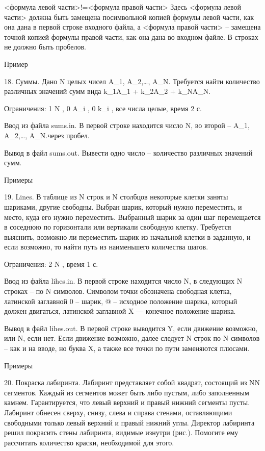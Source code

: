 \documentclass[]{article}
\begin{document}
<формула левой части>!=<формула правой части>
Здесь <формула левой части> должна быть замещена посимвольной копией формулы левой части, как она дана в первой строке входного файла, а <формула правой части> – замещена точной копией формулы правой части, как она дана во входном файле. В строках не должно быть пробелов.

Пример



18. Суммы. Дано N целых чисел A_1, A_2,\ldots, A_N. Требуется найти количество различных значений сумм вида k_1A_1 + k_2A_2 + k_NA_N.

Ограничения: 1 \leq N , 0 \leq A_i , 0 \leq k_i , все числа целые, время 2 с.

Ввод из файла sums.in. В первой строке находится число N, во второй – A_1, A_2,\ldots, A_N.через пробел.

Вывод в файл sums.out. Вывести одно число – количество различных значений сумм.

Примеры



19. Lines. В таблице из N строк и N столбцов некоторые клетки заняты шариками, другие свободны. Выбран шарик, который нужно переместить, и место, куда его нужно переместить. Выбранный шарик за один шаг перемещается в соседнюю по горизонтали или вертикали свободную клетку. Требуется выяснить, возможно ли переместить шарик из начальной клетки в заданную, и если возможно, то найти путь из наименьшего количества шагов.

Ограничения: 2 \leq N , время 1 с.

Ввод из файла lihes.in. В первой строке находится число N, в следующих N строках – по N символов. Символом точки обозначена свободная клетка, латинской заглавной 0 – шарик, @ – исходное положение шарика, который должен двигаться, латинской заглавной X — конечное положение шарика.

Вывод в файл lihes.out. В первой строке выводится Y, если движение возможно, или N, если нет. Если движение возможно, далее следует N строк по N символов – как и на вводе, но буква X, а также все точки по пути заменяются плюсами.

Примеры



20. Покраска лабиринта. Лабиринт представляет собой квадрат, состоящий из N\times N сегментов. Каждый из сегментов может быть либо пустым, либо заполненным камнем. Гарантируется, что левый верхний и правый нижний сегменты пусты. Лабиринт обнесен сверху, снизу, слева и справа стенами, оставляющими свободными только левый верхний и правый нижний углы. Директор лабиринта решил покрасить стены лабиринта, видимые изнутри (рис.). Помогите ему рассчитать количество краски, необходимой для этого.
\end{document}
